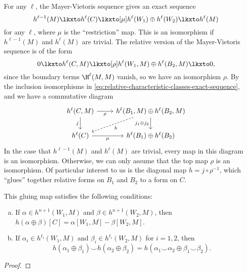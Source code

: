 For any $\ell$, the Mayer-Vietoris sequence gives an exact sequence
\[
	h^{\ell-1}(M)\lkxto h^{\ell}(C) \lkxto[\mu] h^{\ell}(W_1)\oplus h^{\ell}(W_2) \lkxto h^{\ell}(M)
\]
for any $\ell$, where $\mu$ is the ``restriction'' map. This is an isomorphism if $h^{\ell-1}(M)$ and $h^\ell(M)$ are trivial.
The relative version of the Mayer-Vietoris sequence is of the form
\[
	0 \lkxto h^{\ell}(C, M) \lkxto[\rho] h^{\ell}(W_1,M)\oplus h^{\ell}(B_2,M) \lkxto 0,
\]
since the boundary terms $\H^\ell(M,M)$ vanish, so we have an isomorphism $\rho$.
By the inclusion isomorphisms in \cref{eq:relative-characteristic-classes-exact-sequence}, and we have a commutative diagram
\begin{equation}\label{eq:closing_coboundaries_square}
	\begin{tikzcd}
		{h^{\ell}(C,M)} & {h^{\ell}(B_1,M)\oplus h^{\ell}(B_2,M)} \\
		{h^{\ell}(C)} & {h^{\ell}(B_1)\oplus h^{\ell}(B_2)}
		\arrow["j_1\oplus j_2"', from=1-2, to=2-2]
		\arrow["\rho"', from=1-1, to=1-2]
		\arrow["j"', from=1-1, to=2-1]
		\arrow["\mu"', from=2-1, to=2-2]
		\arrow["h", from=1-2, to=2-1, dashed]
	\end{tikzcd}
\end{equation}
In the case that $h^{\ell-1}(M)$ and $h^\ell(M)$ are trivial, every map in this diagram is an isomorphism. Otherwise, we can only assume that the top map $\rho$ is an isomorphism.
Of particular interest to us is the diagonal map $h = j\circ \rho^{-1}$, which ``glues'' together relative forms on $B_1$ and $B_2$ to a form on $C$. 

\begin{proposition}\label{prop:invariant-variation-naturality}
	This gluing map satisfies the following conditions:
	\begin{enumerate}[(a)]
		\item If $\alpha\in h^{n+1}(W_1, M)$ and $\beta\in h^{n+1}(W_2,M)$, then
		      $h(\alpha\oplus \beta)[C] = \alpha[W_1, M] - \beta[W_2, M]$.
		\item If $\alpha_i\in h^{\ell_i}(W_1,M)$ and $\beta_i \in h^{\ell_i}(W_2,M)$ for $i=1,2$, then
		      \[h(\alpha_1\oplus\beta_1) \smile h(\alpha_2\oplus \beta_2) = h(\alpha_1\smile \alpha_2 \oplus \beta_1\smile \beta_2).\]
	\end{enumerate}
\end{proposition}
\begin{proof}
\end{proof}

